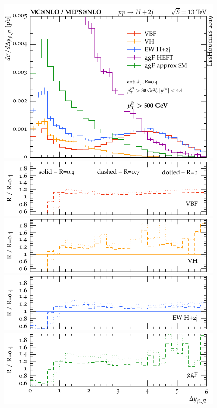 \documentclass[10pt,prd,fleqn,superscriptaddress,notitlepage,nofootinbib,preprintnumbers,nobalancelastpage]{revtex4-1}
\begin{document}
\begin{figure}[p]
\begin{minipage}{.2925\textwidth}
  \end{minipage}\hfill
  \begin{minipage}{.2925\textwidth}
    \includegraphics[width=\textwidth]{figures/channels/delta_y_jj12_pth500.pdf}
    \includegraphics[width=\textwidth]{figures/channels/delta_y_jj12_pth500_rVBF.pdf}
    \includegraphics[width=\textwidth]{figures/channels/delta_y_jj12_pth500_rVH.pdf}
    \includegraphics[width=\textwidth]{figures/channels/delta_y_jj12_pth500_rHJJ.pdf}
    \includegraphics[width=\textwidth]{figures/channels/delta_y_jj12_pth500_rGGH.pdf}

\end{minipage}
\end{figure}
\end{document}
